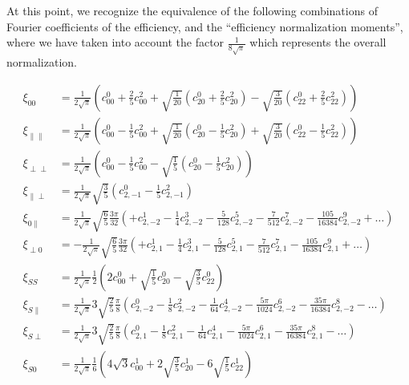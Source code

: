 At this point, we recognize the equivalence of the following combinations of Fourier coefficients
of the efficiency, and the ``efficiency normalization moments'', where we have taken into account
the factor $\frac{1}{8\sqrt{\pi}}$ which represents the overall normalization. 

\begin{align}
  \xi_{00}                 &= \frac{1}{2\sqrt{\pi}} \left( c^0_{00}+\frac{2}{5}c^2_{00}+\sqrt{\frac{1}{20}}(c^0_{20}+\frac{2}{5}c^2_{20})-\sqrt{\frac{3}{20}}(c^0_{22}+\frac{2}{5}c^2_{22}) \right) \\
  \xi_{\parallel\parallel} &= \frac{1}{2\sqrt{\pi}} \left( c^0_{00}-\frac{1}{5}c^2_{00}+\sqrt{\frac{1}{20}}\left(c^0_{20}-\frac{1}{5}c^2_{20}\right)+\sqrt{\frac{3}{20}}\left(c^0_{22}-\frac{1}{5}c^2_{22}\right)  \right)  \\
  \xi_{\perp\perp}         &= \frac{1}{2\sqrt{\pi}} \left( c^0_{00}-\frac{1}{5}c^2_{00} - \sqrt{\frac{1}{5}}\left(c^0_{20}-\frac{1}{5}c^2_{20}\right)\right)\\
  \xi_{\parallel\perp}     &= \frac{1}{2\sqrt{\pi}} \sqrt{\frac{3}{5}}\left(c^0_{2,-1}-\frac{1}{5}c^2_{2,-1}\right)  \\
  \xi_{0\parallel}         &= \frac{1}{2\sqrt{\pi}} \sqrt{\frac{6}{5}}\frac{3\pi}{32}\left( +c^1_{2,-2}-\frac{1}{4}c^3_{2,-2}-\frac{5}{128}c^5_{2,-2}-\frac{7}{512}c^7_{2,-2} - \frac{105}{16384}c^9_{2,-2}+\ldots \right) \\
  \xi_{\perp 0}            &= -\frac{1}{2\sqrt{\pi}} \sqrt{\frac{6}{5}}\frac{3\pi}{32}\left( +c^1_{2,1} -\frac{1}{4}c^3_{2,1}- \frac{5}{128}c^5_{2,1} -\frac{7}{512}c^7_{2,1} - \frac{105}{16384}c^9_{2,1}+\ldots \right) \\
  \xi_{SS}               &=  \frac{1}{2\sqrt{\pi}}\frac{1}{2} \left(2c^0_{00} + \sqrt{\frac{1}{5}}c^0_{20} -\sqrt{\frac{3}{5}} c^0_{22}\right) \\
  \xi_{S \parallel}        &=  \frac{1}{2\sqrt{\pi}} 3 \sqrt{\frac{2}{5}}\frac{\pi}{8} \left(c^0_{2,-2}-\frac{1}{8}c^2_{2,-2}-\frac{1}{64}c^4_{2,-2}-\frac{5\pi}{1024}c^6_{2,-2}-\frac{35\pi}{16384}c^8_{2,-2}-\ldots\right)\\
  \xi_{S \perp}           &= \frac{1}{2\sqrt{\pi}} 3\sqrt{\frac{2}{5}} \frac{\pi}{8} \left(c^0_{2,1}-\frac{1}{8}c^2_{2,1}-\frac{1}{64}c^4_{2,1}-\frac{5\pi}{1024}c^6_{2,1}-\frac{35\pi}{16384}c^8_{2,1}-\ldots\right)\\
  \xi_{S 0}              &= \frac{1}{2\sqrt{\pi}}\frac{1}{6}\left(4\sqrt{3}  c^1_{00} + 2 \sqrt{\frac{3}{5}} c^1_{20} - 6 \sqrt{\frac{1}{5}}c^1_{22}\right)
\end{align}

